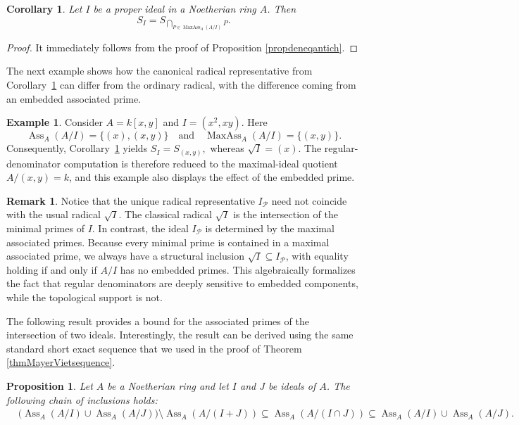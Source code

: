 \documentclass[11pt,leqno]{amsart}
\newtheorem{proposition}[theorem]{Proposition}
\newtheorem{corollary}[theorem]{Corollary}
\theoremstyle{definition}
\newtheorem{remark}[theorem]{Remark}
\newtheorem{example}[theorem]{Example}
\numberwithin{equation}{section}
\DeclareMathOperator{\Ass}{Ass}
\DeclareMathOperator{\MaxAss}{MaxAss}
\begin{document}
\begin{corollary}\label{corollradical}
    Let $I$ be a proper ideal in a Noetherian ring $A$. Then 
$$S_I=S_{\bigcap_{P\in\MaxAss_A(A/I)}P}.$$
\end{corollary}

\begin{proof}
    It immediately follows from the proof of Proposition \ref{propdeneqantich}.
\end{proof}

The next example shows how the canonical radical representative from Corollary~\ref{corollradical} can differ from the ordinary radical, with the difference coming from an embedded associated prime.

\begin{example}
Consider $A=k[x,y]$ and $I=(x^2,xy)$. Here
\[
\Ass_A(A/I)=\{(x),(x,y)\}\quad \text{and}\quad
\MaxAss_A(A/I)=\{(x,y)\}.
\]
Consequently, Corollary~\ref{corollradical} yields
$
S_I=S_{(x,y)},
$
whereas $\sqrt I=(x)$. The regular-denominator computation is therefore reduced to the maximal-ideal quotient $A/(x,y)=k$, and this example also displays the effect of the embedded prime.
\end{example}


\begin{remark}\label{rem:den-radical}
Notice that the unique radical representative $I_{\mathcal{P}}$ need not coincide with the  usual radical $\sqrt{I}$. The classical radical $\sqrt{I}$  is the intersection of the minimal primes of $I$. In contrast, the ideal $I_{\mathcal{P}}$ is determined by the maximal associated primes. Because every minimal prime is contained in a maximal associated prime, we always have a structural inclusion $\sqrt{I} \subseteq I_{\mathcal{P}}$, with equality holding if and only if $A/I$ has no embedded primes. This algebraically formalizes the fact that regular denominators are deeply sensitive to embedded components, while the topological support is not.
\end{remark}

The following result provides a bound for the associated primes of the intersection of two ideals. Interestingly, the result can be derived using the same standard short exact sequence that we used in the proof of Theorem \ref{thmMayerVietsequence}.

\begin{proposition}
\label{propass}
Let $A$ be a Noetherian ring and let $I$ and $J$ be ideals of $A$. The following chain of inclusions holds:
\begin{align*}
&\bigl(\Ass_A(A/I)\cup\Ass_A(A/J)\bigr)
\setminus\Ass_A(A/(I+J))
\subseteq\Ass_A(A/(I\cap J))
\subseteq\Ass_A(A/I)\cup\Ass_A(A/J).
\end{align*}
\end{proposition}
\end{document}

